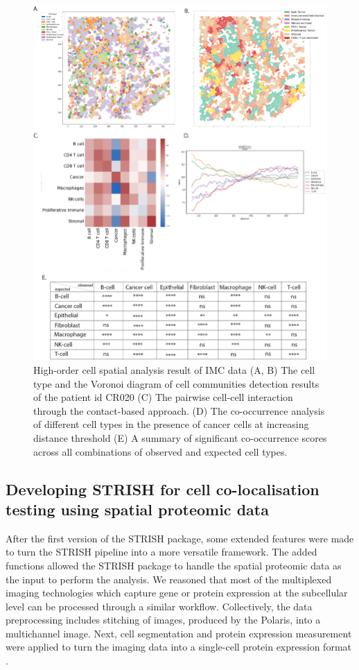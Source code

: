\begin{figure}
    \centering
    \includegraphics[width=0.8\columnwidth]{Chapter3/Figures/Chap3_figure4_v2.png}
    \caption[High-order cell spatial  analysis result of IMC data.]{High-order cell spatial  analysis result of IMC data (A, B) The cell type and the Voronoi diagram of cell communities detection results of the patient id CR020 (C) The pairwise cell-cell interaction through the contact-based approach. (D) The co-occurrence analysis of different cell types in the presence of cancer cells at increasing distance threshold (E) A summary of significant co-occurrence scores across all combinations of observed and expected cell types.}
    \label{fig:colorectal_cancer_IMC}
    
\end{figure}

\subsection{Developing STRISH for cell co-localisation testing using spatial proteomic data}
\label{Sec:3.Cell_colocalisation_PD1_PDL1}	%
After the first version of the STRISH package, some extended features were made to turn the STRISH pipeline into a more versatile framework. The added functions allowed the STRISH package to handle the spatial proteomic data as the input to perform the analysis. We reasoned that most of the multiplexed imaging technologies which capture gene or protein expression at the subcellular level can be processed through a similar workflow. Collectively, the data preprocessing includes stitching of images, produced by the Polaris, into a multichannel image. Next, cell segmentation and protein expression measurement were applied to turn the imaging data into a single-cell protein expression format \cite{shakya2020immune, liu2019comparison, aghaeepour2013critical}.

